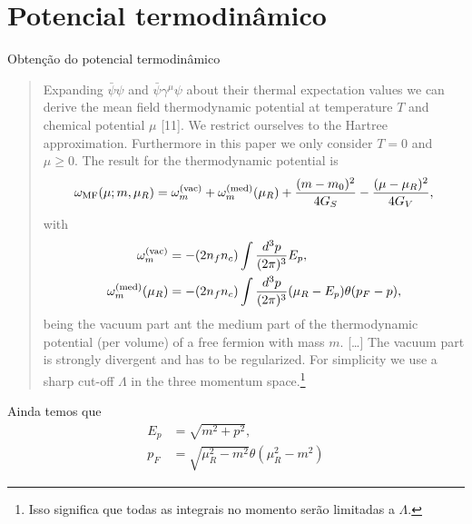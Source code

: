 \section{Potencial termodinâmico}

Obtenção do potencial termodinâmico
\begin{quote}
Expanding $\bar{\psi}\psi$ and $\bar{\psi}\gamma^\mu\psi$ about their thermal expectation values we can derive the mean field thermodynamic potential at temperature $T$ and chemical potential $\mu$ [11]. We restrict ourselves to the Hartree approximation. Furthermore in this paper we only consider $T=0$ and $\mu \geqslant 0$. The result for the thermodynamic potential is
\begin{equation}\label{Eq:Def_pot_termo}
	\omega_{\rm{MF}}(\mu; m, \mu_R) = \omega_m^{\rm{(vac)}} + \omega_m^{\rm{(med)}}(\mu_R) + \frac{(m - m_0)^2}{4G_S} - \frac{(\mu - \mu_R)^2}{4G_V},
\end{equation}
%
with
\begin{align}
	\omega_m^{\rm{(vac)}} &= - (2n_fn_c) \int \frac{d^3p}{(2\pi)^3} E_p, \label{Eq:Def_omega_vac}\\
	\omega_m^{\rm{(med)}}(\mu_R) &= - (2n_fn_c) \int \frac{d^3p}{(2\pi)^3}(\mu_R - E_p)\theta(p_F - p), \label{Eq:Def_omega_med}
\end{align}
%
being the vacuum part ant the medium part of the thermodynamic potential (per volume) of a free fermion with mass $m$. [\dots] The vacuum part is strongly divergent and has to be regularized. For simplicity we use a sharp cut-off $\Lambda$ in the three momentum space.\footnote{Isso significa que todas as integrais no momento serão limitadas a $\Lambda$.}
\end{quote}
%
Ainda temos que
\begin{align}
	E_p &= \sqrt{m^2+p^2}, \label{Eq:Def_E}\\
	p_F &= \sqrt{\mu_R^2 - m^2}\theta(\mu_R^2 - m^2) \label{Eq:Rel_pot_quim_renorm_mom_fermi}
\end{align}

